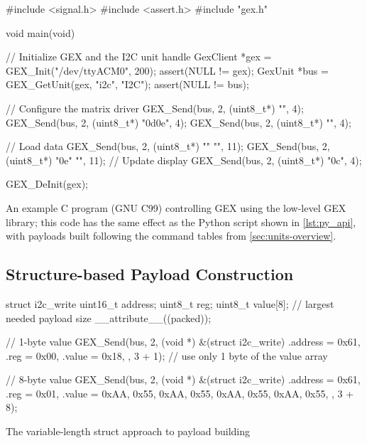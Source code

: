\begin{listing}
	\begin{ccode}
	#include <signal.h>
	#include <assert.h>
	#include "gex.h"
			
	void main(void)
	{
	    // Initialize GEX and the I2C unit handle
	    GexClient *gex = GEX_Init("/dev/ttyACM0", 200);
	    assert(NULL != gex);        
	    GexUnit *bus = GEX_GetUnit(gex, "i2c", "I2C");
	    assert(NULL != bus);
	    	    
	    // Configure the matrix driver
	    GEX_Send(bus, 2, (uint8_t*) "\x00", 4);
	    GEX_Send(bus, 2, (uint8_t*) "\x0d\x0e", 4);
	    GEX_Send(bus, 2, (uint8_t*) "", 4);
	    
	    // Load data
	    GEX_Send(bus, 2, (uint8_t*) ""
	                                "\xAA{}\xAA{}\xAA{}\xAA{}", 11);
	    GEX_Send(bus, 2, (uint8_t*) "\x0e"
	                                "\xFF{}\xFF{}\xFF{}\xFF{}", 11);
	    // Update display
	    GEX_Send(bus, 2, (uint8_t*) "\x0c", 4);
	    	    
	    GEX_DeInit(gex);
	}    
	\end{ccode}
	\caption{\label{lst:c_api_full} An example C program (GNU C99) controlling GEX using the low-level GEX library; this code has the same effect as the Python script shown in \cref{lst:py_api}, with payloads built following the command tables from \cref{sec:units-overview}.}
\end{listing}

\subsection{Structure-based Payload Construction}

\begin{listing}
	\begin{ccode}
		struct i2c_write {
			uint16_t address;
			uint8_t reg;
			uint8_t value[8]; // largest needed payload size
		} __attribute__((packed));
		
		// 1-byte value
		GEX_Send(bus, 2, (void *) &(struct i2c_write) {
			.address = 0x61,
			.reg = 0x00,
			.value = {0x18},
		}, 3 + 1); // use only 1 byte of the value array
		
		// 8-byte value
		GEX_Send(bus, 2, (void *) &(struct i2c_write) {
			.address = 0x61,
			.reg = 0x01,
			.value = {0xAA, 0x55, 0xAA, 0x55, 0xAA, 0x55, 0xAA, 0x55},
		}, 3 + 8);
	\end{ccode}
	\caption{\label{lst:c_api_struct} The variable-length struct approach to payload building}
\end{listing}

